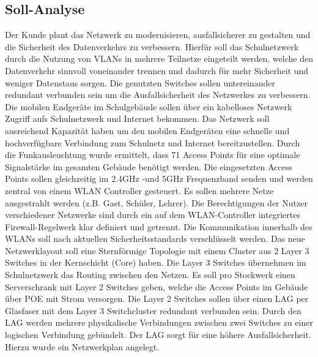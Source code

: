 \subsection{Soll-Analyse}
\label{sec:Soll-Analyse}
Der Kunde plant das Netzwerk zu modernisieren, ausfallsicherer zu gestalten und die Sicherheit des Datenverkehrs zu verbessern. Hierfür soll das Schulnetzwerk durch die Nutzung von \acs{VLAN}s in mehrere Teilnetze eingeteilt werden, welche den Datenverkehr sinnvoll voneinander trennen und dadurch für mehr Sicherheit und weniger Datenstaus sorgen. Die genutzten Switches sollen untereinander redundant verbunden sein um die Ausfallsicherheit des Netzwerkes zu verbessern. Die mobilen Endgeräte im Schulgebäude sollen über ein kabelloses Netzwerk Zugriff aufs Schulnetzwerk und Internet bekommen. Das Netzwerk soll ausreichend Kapazität haben um den mobilen Endgeräten eine schnelle und hochverfügbare Verbindung zum Schulnetz und Internet bereitzustellen. Durch die Funkausleuchtung wurde ermittelt, dass 71 Access Points für eine optimale Signalstärke im gesamten Gebäude benötigt werden.
Die eingesetzten Access Points sollen gleichzeitig im 2.4GHz -und 5GHz Frequenzband senden und werden zentral von einem WLAN Controller gesteuert.
Es sollen mehrere Netze ausgestrahlt werden (z.B. Gast, Schüler, Lehrer). 
Die Berechtigungen der Nutzer verschiedener Netzwerke sind durch ein auf dem WLAN-Controller integriertes Firewall-Regelwerk klar definiert und getrennt. 
Die Kommunikation innerhalb des WLANs soll nach aktuellen Sicherheitsstandards verschlüsselt werden. Das neue Netzwerklayout soll eine Sternförmige Topologie mit einem Cluster aus 2 Layer 3 Switches in der Kernschicht (Core) haben. Die Layer 3 Switches übernehmen im Schulnetzwerk das Routing zwischen den Netzen. Es soll pro Stockwerk einen Serverschrank mit Layer 2 Switches geben, welche die Access Points im Gebäude über \ac{POE} mit Strom versorgen. Die Layer 2 Switches sollen über einen \ac{LAG} per Glasfaser mit dem Layer 3 Switchcluster redundant verbunden sein. Durch den LAG werden mehrere physikalische Verbindungen zwischen zwei Switches zu einer logischen Verbindung gebündelt. Der LAG sorgt für eine höhere Ausfallsicherheit. Hierzu wurde ein Netzwerkplan angelegt.

\begin{comment}
	\item Wie ist die bisherige Situation (\zB bestehende Programme, Wünsche der Mitarbeiter)?
	\item Was gilt es zu erstellen/verbessern?
\end{comment}
